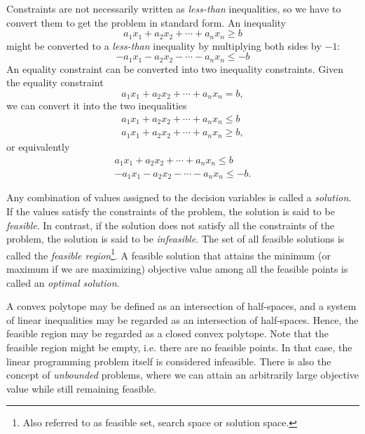 Constraints are not necessarily written as
\textit{less-than} inequalities, so we have to convert them to get the problem
in standard form. An inequality
\[
a_1 x_1 + a_2 x_2 + \cdots + a_n x_n \geq b
\]
might be converted to a \textit{less-than} inequality by multiplying both
sides by $-1$:
\[
- a_1 x_1 - a_2 x_2 - \cdots - a_n x_n \leq -b
\]
An equality constraint can be converted into two inequality constraints.
Given the equality constraint
\[
a_1 x_1 + a_2 x_2 + \cdots + a_n x_n = b,
\]
we can convert it into the two inequalities
\[
\begin{array}{c}
a_1 x_1 + a_2 x_2 + \cdots + a_n x_n \leq b \\
a_1 x_1 + a_2 x_2 + \cdots + a_n x_n \geq b,
\end{array}
\]
or equivalently
\[
\begin{array}{c}
a_1 x_1 + a_2 x_2 + \cdots + a_n x_n \leq b \\
- a_1 x_1 - a_2 x_2 - \cdots - a_n x_n \leq -b.
\end{array}
\]

Any combination of values assigned to the decision variables is called a
\textit{solution}.
If the values satisfy the constraints of the problem, the solution is
said to be \textit{feasible}. In contrast, if the solution
does not satisfy all the constraints of the problem, the solution is said to
be \textit{infeasible}. The set of all feasible solutions is called the
\textit{feasible region}\footnote{Also referred to as feasible set,
search space or solution space.}\cite{nocedal}. A feasible solution that
attains the minimum (or maximum if we are maximizing) objective value among all
the feasible points is called an \textit{optimal solution}.

A convex polytope may be defined as an intersection of half-spaces, and a
system of linear inequalities may be regarded as an intersection of
half-spaces\cite{branko}.
Hence, the feasible region may be regarded as a closed convex polytope.
Note that the feasible region might be empty, i.e. there are no feasible
points.
In that case, the linear programming problem itself is considered infeasible.
There is also the concept of \textit{unbounded} problems, where we can attain
an arbitrarily large objective value while still remaining feasible.

